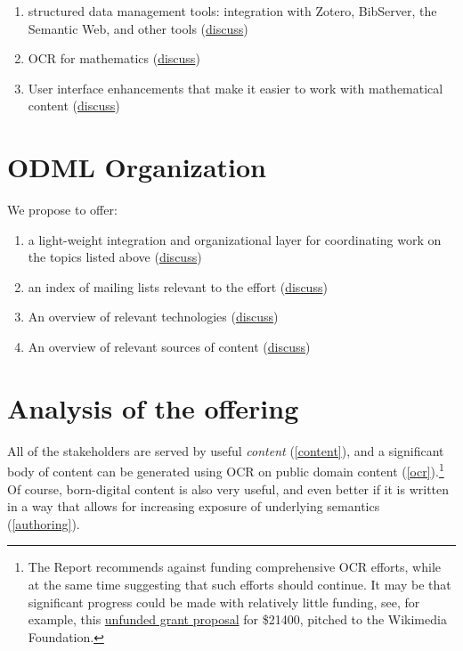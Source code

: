 \documentclass{article}
\begin{document}
\begin{enumerate}
\item\label{data} structured data management tools: integration with Zotero, BibServer, the Semantic Web, and other tools (\href{https://github.com/holtzermann17/skelodml/wiki/J.-structured-data-management-tools}{discuss})
\item\label{ocr} OCR for mathematics (\href{https://github.com/holtzermann17/skelodml/wiki/K.-OCR-for-mathematics}{discuss})
\item\label{ui} User interface enhancements that make it easier to work with mathematical content (\href{https://github.com/holtzermann17/skelodml/wiki/L.-UI-enhancements}{discuss})
\end{enumerate}

\section{ODML Organization}

We propose to offer:

\begin{enumerate}
\item\label{integration} a light-weight integration and organizational layer for coordinating work on the topics listed above (\href{https://github.com/holtzermann17/skelodml/wiki/1.-Home}{discuss})
\item\label{mail} an index of mailing lists relevant to the effort (\href{https://github.com/holtzermann17/skelodml/wiki/2.-Mailing-lists}{discuss})
\item\label{technology} An overview of relevant technologies (\href{https://github.com/holtzermann17/skelodml/wiki/3.-Technology-overview}{discuss})
\item\label{content} An overview of relevant sources of content (\href{https://github.com/holtzermann17/skelodml/wiki/4.-Content-overview}{discuss})
\end{enumerate}

\section{Analysis of the offering}

All of the stakeholders are served by useful \emph{content} (\ref{content}), and a significant body of content can be generated using OCR on public domain content (\ref{ocr}).\footnote{The Report recommends against funding comprehensive OCR efforts, while at the same time suggesting that such efforts should continue.  It may be that significant progress could be made with relatively little funding, see, for example, this \href{http://meta.wikimedia.org/wiki/Grants:IEG/PlanetMath_Books_Project}{unfunded grant proposal} for \$21400, pitched to the Wikimedia Foundation.}  Of course, born-digital content is also very useful, and even better if it is written in a way that allows for increasing exposure of underlying semantics (\ref{authoring}).
\end{document}
